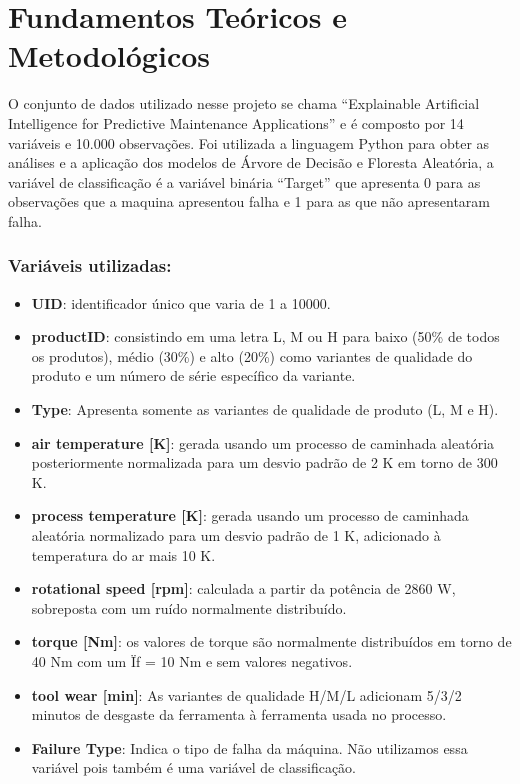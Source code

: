 \documentclass[
  oneclumn]{article}
\begin{document}
\section{Fundamentos Teóricos e
Metodológicos}\label{fundamentos-teuxf3ricos-e-metodoluxf3gicos}

O conjunto de dados utilizado nesse projeto se chama ``Explainable
Artificial Intelligence for Predictive Maintenance Applications'' e é
composto por 14 variáveis e 10.000 observações. Foi utilizada a
linguagem Python para obter as análises e a aplicação dos modelos de
Árvore de Decisão e Floresta Aleatória, a variável de classificação é a
variável binária ``Target'' que apresenta 0 para as observações que a
maquina apresentou falha e 1 para as que não apresentaram falha.

\subsubsection{Variáveis utilizadas:}\label{variuxe1veis-utilizadas}

\begin{itemize}
\item
  \textbf{UID}: identificador único que varia de 1 a 10000.
\item
  \textbf{productID}: consistindo em uma letra L, M ou H para baixo
  (50\% de todos os produtos), médio (30\%) e alto (20\%) como variantes
  de qualidade do produto e um número de série específico da variante.
\item
  \textbf{Type}: Apresenta somente as variantes de qualidade de produto
  (L, M e H).
\item
  \textbf{air temperature {[}K{]}}: gerada usando um processo de
  caminhada aleatória posteriormente normalizada para um desvio padrão
  de 2 K em torno de 300 K.
\item
  \textbf{process temperature {[}K{]}}: gerada usando um processo de
  caminhada aleatória normalizado para um desvio padrão de 1 K,
  adicionado à temperatura do ar mais 10 K.
\item
  \textbf{rotational speed {[}rpm{]}}: calculada a partir da potência de
  2860 W, sobreposta com um ruído normalmente distribuído.
\item
  \textbf{torque {[}Nm{]}}: os valores de torque são normalmente
  distribuídos em torno de 40 Nm com um Ïƒ = 10 Nm e sem valores
  negativos.
\item
  \textbf{tool wear {[}min{]}}: As variantes de qualidade H/M/L
  adicionam 5/3/2 minutos de desgaste da ferramenta à ferramenta usada
  no processo.
\item
  \textbf{Failure Type}: Indica o tipo de falha da máquina. Não
  utilizamos essa variável pois também é uma variável de classificação.
\end{itemize}
\end{document}
